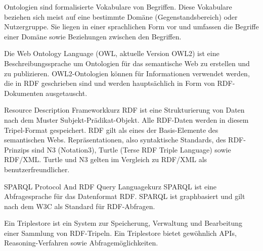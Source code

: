 {Ontologien sind formalisierte Vokabulare von Begriffen. Diese Vokabulare beziehen sich meist auf eine bestimmte Domäne (Gegenstandsbereich) oder Nutzergruppe. Sie liegen in einer sprachlichen Form vor und umfassen die Begriffe einer Domäne sowie Beziehungen zwischen den Begriffen. \cite{owl,ontologie-wiki,fraunhofer}
}

{Die Web Ontology Language (OWL, aktuelle Version OWL2) ist eine Beschreibungssprache um Ontologien für das semantische Web zu erstellen und zu publizieren. OWL2-Ontologien können für Informationen verwendet werden, die in RDF geschrieben sind und werden hauptsächlich in Form von RDF-Dokumenten ausgetauscht.
\cite{owl}
}

{\glqq Resource Description Framework\grqq kurz RDF ist eine Strukturierung von Daten nach
dem Muster Subjekt-Prädikat-Objekt. Alle RDF-Daten werden in diesem Tripel-Format 
gespeichert. RDF gilt als eines der Basis-Elemente des semantischen Webs.
Repräsentationen, also syntaktische Standards, des RDF-Prinzips sind N3 (Notation3), 
Turtle (Terse RDF Triple Language) sowie RDF/XML. Turtle und N3 gelten im Vergleich zu RDF/XML als benutzerfreundlicher. \cite{rdf-primer,rdf-wiki,rdf-xml-wiki}}




{\glqq SPARQL Protocol And RDF Query Language\grqq kurz SPARQL ist eine Abfragesprache für das Datenformat RDF. SPARQL ist graphbasiert und gilt nach dem W3C als Standard für RDF-Abfragen. \cite{w3c-rdf-sparql-query,sparql-wiki}}

{Ein Triplestore ist ein System zur Speicherung, Verwaltung und Bearbeitung einer
 Sammlung von RDF-Tripeln. Ein Triplestore bietet gewöhnlich APIs,
 Rea\-so\-ning-Verfahren sowie Abfragemöglichkeiten. \cite{fraunhofer}}

